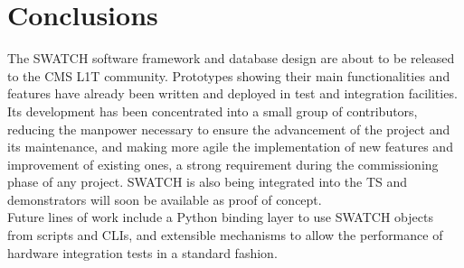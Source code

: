 \documentclass[a4paper]{jpconf}
\begin{document}
\section{Conclusions}

The SWATCH software framework and database design are about to be released to the CMS L1T community. Prototypes showing their main functionalities and features have already been written and deployed in test and integration facilities. Its development has been concentrated into a small group of contributors, reducing the manpower necessary to ensure the advancement of the project and its maintenance, and making more agile the implementation of new features and improvement of existing ones, a strong requirement during the commissioning phase of any project. SWATCH is also being integrated into the TS and demonstrators will soon be available as proof of concept. \\
Future lines of work include a Python binding layer to use SWATCH objects from scripts and CLIs, and extensible mechanisms to allow the performance of hardware integration tests in a standard fashion. 
\end{document}

